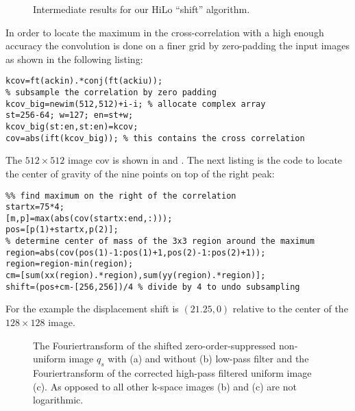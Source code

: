 \begin{figure}[htb]
  \centering {}
  \caption{Intermediate results for our HiLo ``shift'' algorithm.}
  \label{fig:hilo3}
\end{figure}
In order to locate the maximum in the cross-correlation with a high
enough accuracy the convolution is done on a finer grid by
zero-padding the input images as shown in the following listing: 
\begin{lstlisting}
kcov=ft(ackin).*conj(ft(ackiu));
% subsample the correlation by zero padding
kcov_big=newim(512,512)+i-i; % allocate complex array
st=256-64; w=127; en=st+w;
kcov_big(st:en,st:en)=kcov;
cov=abs(ift(kcov_big)); % this contains the cross correlation
\end{lstlisting}
The $512\times512$ image {\sf cov} is shown in  and
. The next listing is the code to locate the center
of gravity of the nine points on top of the right peak:
\begin{lstlisting}
%% find maximum on the right of the correlation
startx=75*4;
[m,p]=max(abs(cov(startx:end,:)));
pos=[p(1)+startx,p(2)];
% determine center of mass of the 3x3 region around the maximum
region=abs(cov(pos(1)-1:pos(1)+1,pos(2)-1:pos(2)+1));
region=region-min(region);
cm=[sum(xx(region).*region),sum(yy(region).*region)];
shift=(pos+cm-[256,256])/4 % divide by 4 to undo subsampling
\end{lstlisting}
For the example the displacement {\sf shift} is $(21.25,0)$ relative
to the center of the $128\times128$ image.
\begin{figure}[htb]
  \centering {}
  \caption{The Fouriertransform of the shifted zero-order-suppressed
    non-uniform image $q_s$ with (a) and without (b) low-pass filter
    and the Fouriertransform of the corrected high-pass filtered
    uniform image (c). As opposed to all other k-space images (b) and
    (c) are not logarithmic.}
  \label{fig:hilo3_2}
\end{figure}
